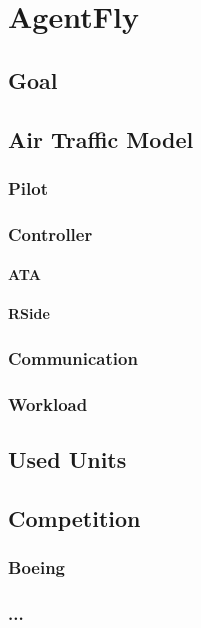 \chapter{AgentFly}

\section{Goal}

\section{Air Traffic Model}
\subsection{Pilot}
\subsection{Controller}
\subsubsection{ATA}
\subsubsection{RSide}
\subsection{Communication}
\subsection{Workload}

\section{Used Units}

\section{Competition}
\subsection{Boeing}
\subsection{...}